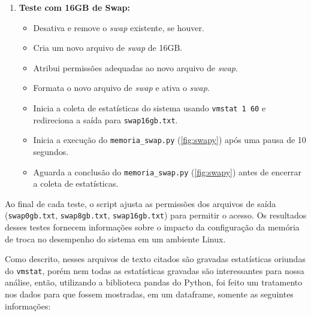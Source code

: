 \documentclass[
	12pt,				%
	openright,			%
	oneside,			%
	a4paper,			%
	chapter=TITLE,		%
	english,			%
	french,				%
	spanish,			%
	brazil				%
	]{abntex2}
\theoremstyle{definition}
\begin{document}
\begin{enumerate}[label=\arabic*.]
    \item \textbf{Teste com 16GB de Swap:}
    \begin{itemize}
        \item Desativa e remove o \textit{swap} existente, se houver.
        \item Cria um novo arquivo de \textit{swap} de 16GB.
        \item Atribui permissões adequadas ao novo arquivo de \textit{swap}.
        \item Formata o novo arquivo de \textit{swap} e ativa o \textit{swap}.
        \item Inicia a coleta de estatísticas do sistema usando \texttt{vmstat 1 60} e redireciona a saída para \texttt{swap16gb.txt}.
        \item Inicia a execução do \texttt{memoria\_swap.py} (\ref{fig:swapy}) após uma pausa de 10 segundos.
        \item Aguarda a conclusão do \texttt{memoria\_swap.py} (\ref{fig:swapy}) antes de encerrar a coleta de estatísticas.
    \end{itemize}
\end{enumerate}

Ao final de cada teste, o script ajusta as permissões dos arquivos de saída (\texttt{swap0gb.txt}, 
\texttt{swap8gb.txt}, \texttt{swap16gb.txt}) para permitir o acesso. Os resultados desses testes 
fornecem informações sobre o impacto da configuração da memória de troca no desempenho do sistema 
em um ambiente Linux.

Como descrito, nesses arquivos de texto citados são gravadas estatísticas oriundas do \texttt{vmstat}, porém nem todas 
as estatísticas gravadas são interessantes para nossa análise, então, utilizando a biblioteca pandas do Python, foi feito um tratamento 
nos dados para que fossem mostradas, em um dataframe, somente as seguintes informações:
\end{document}

